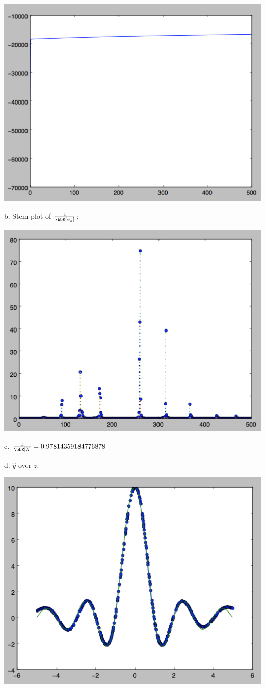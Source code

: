 \documentclass[twoside,11pt]{homework}
\begin{document}
\includegraphics[scale=.5]{images/3objfunc.png}

b. Stem plot of $\frac{1}{\bbE[\alpha_k]}$:

\includegraphics[scale=.5]{images/3stem.png}

c. $\frac{1}{\bbE[\lambda]} = 0.97814359184776878$

d. $\hat{y}$ over $z$:

\includegraphics[scale=.5]{images/3yhat.png}
\end{document}
